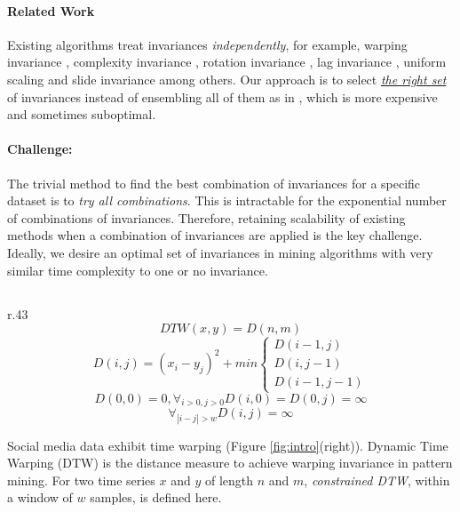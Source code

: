 
\paragraph{Related Work}

Existing algorithms treat invariances {\it independently}, for example, warping invariance \cite{Keogh:02}, complexity invariance \cite{Batista2013}, rotation invariance \cite{Vlachos2004}, lag invariance \cite{Sakurai:05}, uniform scaling \cite{Yankov:07} and slide invariance \cite{Mueen:11} among others. Our approach is to select {\ul{\it the right set}} of invariances instead of ensembling all of them as in \cite{Lines2014}, which is more expensive and sometimes suboptimal.

 

\paragraph{Challenge:} The trivial method to find the best combination of invariances for a specific dataset is to {\it try all combinations}. This is intractable for the exponential number of combinations of invariances. Therefore, retaining scalability of existing methods when a combination of invariances are applied is the key challenge. Ideally, we desire an optimal set of invariances in mining algorithms with very similar time complexity to one or no invariance.

\subsection{\Tthreeone}

\begin{wrapfigure}{r}{.43\textwidth}
\vspace{-1.3cm}
\[ DTW(x,y) = D(n,m) \]
\[ D(i,j) = (x_i-y_j)^2 + min \left\{ \begin{array}{l}
         D(i-1,j)\\
        D(i,j-1)\\
        D(i-1,j-1)\end{array} \right. \]
        \[    D(0,0) = 0, \forall_{i>0,j>0} D(i,0) = D(0,j) = \infty \]
		\[	\forall_{|i-j|>w} D(i,j) = \infty \]
\vspace{-0.7cm}
\end{wrapfigure}
Social media data exhibit time warping (Figure \ref{fig:intro}(right)). Dynamic Time Warping (DTW) is the distance measure to achieve warping invariance in pattern mining. For two time series $x$ and $y$ of length $n$ and $m$, {\it constrained DTW}, within a window of $w$ samples, is defined here.

